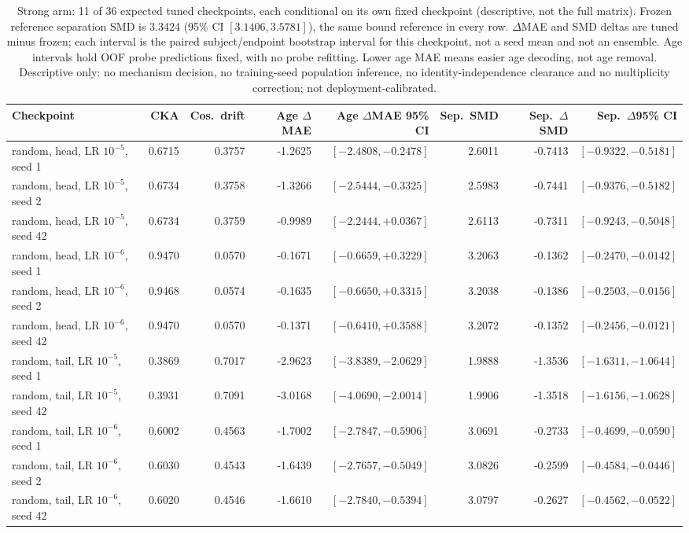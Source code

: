 \begin{table}[!t]
\caption{Strong arm: 11 of 36 expected tuned checkpoints, each conditional on its own fixed checkpoint (descriptive, not the full matrix). Frozen reference separation SMD is 3.3424 (95\% CI $[3.1406,3.5781]$), the same bound reference in every row. $\Delta$MAE and SMD deltas are tuned minus frozen; each interval is the paired subject/endpoint bootstrap interval for this checkpoint, not a seed mean and not an ensemble. Age intervals hold OOF probe predictions fixed, with no probe refitting. Lower age MAE means easier age decoding, not age removal. Descriptive only: no mechanism decision, no training-seed population inference, no identity-independence clearance and no multiplicity correction; not deployment-calibrated.}
\label{tab:common-mechanism-strong}
\centering\scriptsize
\begin{tabular}{@{}lrrrrrrr@{}}
\toprule
Checkpoint & CKA & Cos.\ drift & Age $\Delta$MAE & Age $\Delta$MAE 95\% CI & Sep.\ SMD & Sep.\ $\Delta$SMD & Sep.\ $\Delta$95\% CI \\
\midrule
random, head, LR $10^{-5}$, seed 1 & 0.6715 & 0.3757 & -1.2625 & $[-2.4808,-0.2478]$ & 2.6011 & -0.7413 & $[-0.9322,-0.5181]$ \\
random, head, LR $10^{-5}$, seed 2 & 0.6734 & 0.3758 & -1.3266 & $[-2.5444,-0.3325]$ & 2.5983 & -0.7441 & $[-0.9376,-0.5182]$ \\
random, head, LR $10^{-5}$, seed 42 & 0.6734 & 0.3759 & -0.9989 & $[-2.2444,+0.0367]$ & 2.6113 & -0.7311 & $[-0.9243,-0.5048]$ \\
random, head, LR $10^{-6}$, seed 1 & 0.9470 & 0.0570 & -0.1671 & $[-0.6659,+0.3229]$ & 3.2063 & -0.1362 & $[-0.2470,-0.0142]$ \\
random, head, LR $10^{-6}$, seed 2 & 0.9468 & 0.0574 & -0.1635 & $[-0.6650,+0.3315]$ & 3.2038 & -0.1386 & $[-0.2503,-0.0156]$ \\
random, head, LR $10^{-6}$, seed 42 & 0.9470 & 0.0570 & -0.1371 & $[-0.6410,+0.3588]$ & 3.2072 & -0.1352 & $[-0.2456,-0.0121]$ \\
random, tail, LR $10^{-5}$, seed 1 & 0.3869 & 0.7017 & -2.9623 & $[-3.8389,-2.0629]$ & 1.9888 & -1.3536 & $[-1.6311,-1.0644]$ \\
random, tail, LR $10^{-5}$, seed 42 & 0.3931 & 0.7091 & -3.0168 & $[-4.0690,-2.0014]$ & 1.9906 & -1.3518 & $[-1.6156,-1.0628]$ \\
random, tail, LR $10^{-6}$, seed 1 & 0.6002 & 0.4563 & -1.7002 & $[-2.7847,-0.5906]$ & 3.0691 & -0.2733 & $[-0.4699,-0.0590]$ \\
random, tail, LR $10^{-6}$, seed 2 & 0.6030 & 0.4543 & -1.6439 & $[-2.7657,-0.5049]$ & 3.0826 & -0.2599 & $[-0.4584,-0.0446]$ \\
random, tail, LR $10^{-6}$, seed 42 & 0.6020 & 0.4546 & -1.6610 & $[-2.7840,-0.5394]$ & 3.0797 & -0.2627 & $[-0.4562,-0.0522]$ \\
\bottomrule
\end{tabular}
\end{table}

